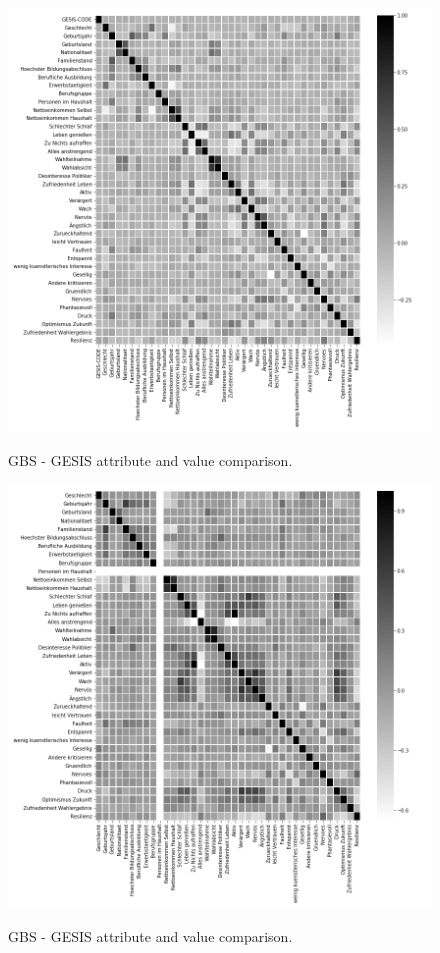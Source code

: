 \begin{figure}[ht]
	\begin{center}
		\includegraphics[scale=0.52,angle=0]{fig/gesis_corr}
		\label{std}
		\caption{GBS - GESIS attribute and value comparison.}
	\end{center}
\end{figure}

\begin{figure}[ht]
	\begin{center}
		\includegraphics[scale=0.52,angle=0]{fig/gbs_corr}
		\label{std}
		\caption{GBS - GESIS attribute and value comparison.}
	\end{center}
\end{figure}


